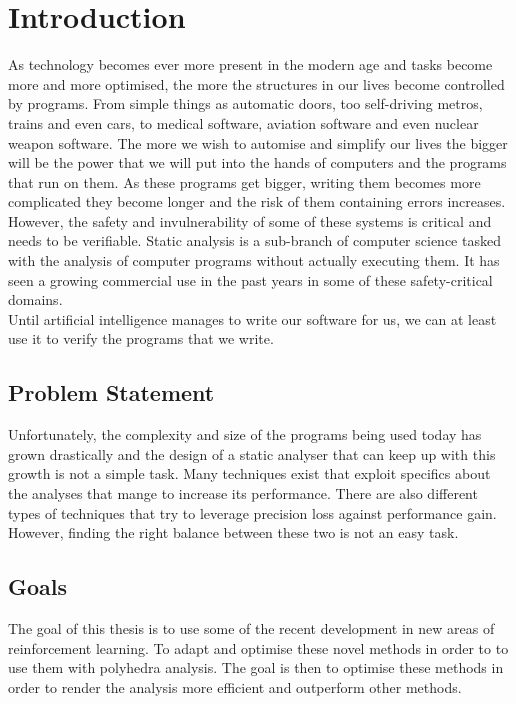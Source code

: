 
\setcounter{chapter}{0}

\chapter{Introduction}
As technology becomes ever more present in the modern age and tasks become more and more optimised, the more the structures in our lives become controlled by programs. From simple things as automatic doors, too self-driving metros, trains and even cars, to medical software, aviation software and even nuclear weapon software. The more we wish to automise and simplify our lives the bigger will be the power that we will put into the hands of computers and the programs that run on them. As these programs get bigger, writing them becomes more complicated they become longer and the risk of them containing errors increases. However, the safety and invulnerability of some of these systems is critical and needs to be verifiable. Static analysis is a sub-branch of computer science tasked with the analysis of computer programs without actually executing them. It has seen a growing commercial use in the past years in some of these safety-critical domains.\\
Until artificial intelligence manages to write our software for us, we can at least use it to verify the programs that we write.

\section{Problem Statement}

Unfortunately, the complexity and size of the programs being used today has grown drastically and the design of a static analyser that can keep up with this growth is not a simple task. Many techniques exist that exploit specifics about the analyses that mange to increase its performance. There are also different types of techniques that try to leverage precision loss against performance gain. However, finding the right balance between these two is not an easy task.
 

\section{Goals}
The goal of this thesis is to use some of the recent development in new areas of reinforcement learning. To adapt and optimise these novel methods in order to to use them with polyhedra analysis. The goal is then to optimise these methods in order to render the analysis more efficient and outperform other methods.


